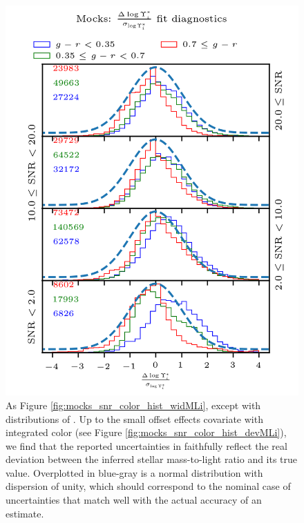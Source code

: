 \begin{figure}
    \centering
    \includegraphics{mocks_snr_color_hist_devwidMLi}
    \caption[As Figure \ref{fig:mocks_snr_color_hist_widMLi}, except with distributions of ]{\fixspacing As Figure \ref{fig:mocks_snr_color_hist_widMLi}, except with distributions of . Up to the small offset effects covariate with integrated color (see Figure \ref{fig:mocks_snr_color_hist_devMLi}), we find that the reported uncertainties in  faithfully reflect the real deviation between the inferred stellar mass-to-light ratio and its true value. Overplotted in blue-gray is a normal distribution with dispersion of unity, which should correspond to the nominal case of uncertainties that match well with the actual accuracy of an estimate.}
    \label{fig:mocks_snr_color_hist_devwidMLi}
\end{figure}

